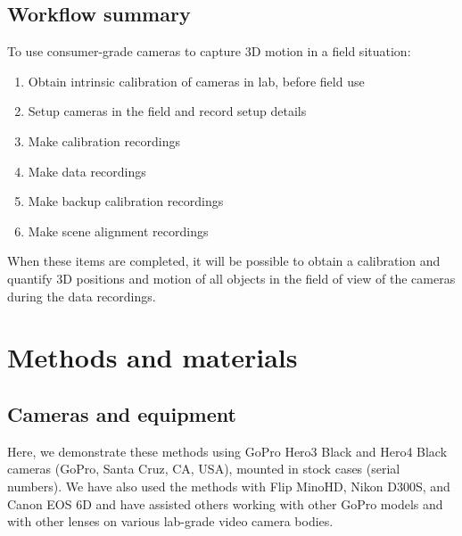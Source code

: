 \documentclass[fleqn,10pt]{wlpeerj}
\begin{document}
\subsection*{Workflow summary}

To use consumer-grade cameras to capture 3D motion in a field situation:
\begin{enumerate}
\item{Obtain intrinsic calibration of cameras in lab, before field use}
\item{Setup cameras in the field and record setup details}
\item{Make calibration recordings}
\item{Make data recordings}
\item{Make backup calibration recordings}
\item{Make scene alignment recordings}
\end{enumerate}

When these items are completed, it will be possible to obtain a calibration and quantify 3D positions and motion of all objects in the field of view of the cameras during the data recordings.  

\section*{Methods and materials}
\subsection*{Cameras and equipment}
Here, we demonstrate these methods using GoPro Hero3 Black and Hero4 Black cameras (GoPro, Santa Cruz, CA, USA), mounted in stock cases (serial numbers).  We have also used the methods with Flip MinoHD, Nikon D300S, and Canon EOS 6D and have assisted others working with other GoPro models and with other lenses on various lab-grade video camera bodies.
\end{document}
